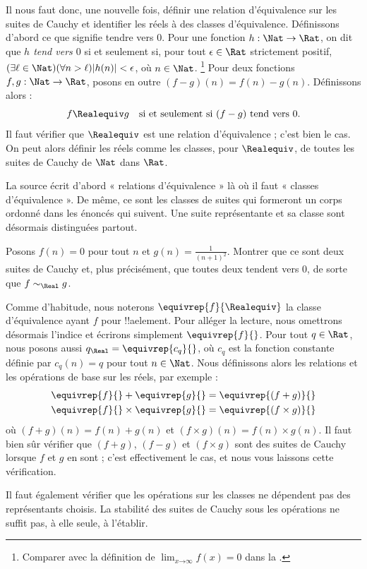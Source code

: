 \documentclass[11pt,a4paper,openany]{memoir}
\begin{document}
Il nous faut donc, une nouvelle fois, définir une relation d'équivalence
sur les suites de Cauchy et identifier les réels à des classes
d'équivalence. Définissons d'abord ce que signifie tendre vers $0$.
Pour une fonction $h:\Nat\to\Rat$, on dit que \emph{$h$ tend vers $0$}
si et seulement si, pour tout $\epsilon\in\Rat$ strictement positif,
$(\exists\ell\in\Nat)(\forall n>\ell)|h(n)|<\epsilon$, où $n\in\Nat$.
\footnote{Comparer avec la définition de
$\lim_{x\mathord{\rightarrow}\infty}f(x)=0$ dans la
.}
Pour deux fonctions $f,g:\Nat\to\Rat$, posons en outre
$(f-g)(n)=f(n)-g(n)$. Définissons alors :
\[
f\Realequiv g\quad\text{si et seulement si }(f-g)\text{ tend vers }0.
\]
Il faut vérifier que $\Realequiv$ est une relation d'équivalence ;
c'est bien le cas. On peut alors définir les réels comme les classes,
pour $\Realequiv$, de toutes les suites de Cauchy de $\Nat$ dans $\Rat$.
\begin{editorial}
La source écrit d'abord « relations d'équivalence » là où il faut
« classes d'équivalence ». De même, ce sont les classes de suites qui
formeront un corps ordonné dans les énoncés qui suivent. Une suite
représentante et sa classe sont désormais distinguées partout.
\end{editorial}

\begin{prob}
Posons $f(n)=0$ pour tout $n$ et $g(n)=\frac{1}{(n+1)^2}$.
Montrer que ce sont deux suites de Cauchy et, plus précisément, que
toutes deux tendent vers $0$, de sorte que $f\sim_\Real g$.
\end{prob}

Comme d'habitude, nous noterons $\equivrep{f}{\Realequiv}$ la classe
d'équivalence ayant $f$ pour !!a{element}. Pour alléger la lecture,
nous omettrons désormais l'indice et écrirons simplement
$\equivrep{f}{}$. Pour tout $q\in\Rat$, nous posons aussi
$q_\Real=\equivrep{c_q}{}$, où $c_q$ est la fonction constante définie
par $c_q(n)=q$ pour tout $n\in\Nat$. Nous définissons alors les
relations et les opérations de base sur les réels, par exemple :
\begin{align*}
\equivrep{f}{}+\equivrep{g}{}&=\equivrep{(f+g)}{}\\
\equivrep{f}{}\times\equivrep{g}{}&=\equivrep{(f\times g)}{}
\end{align*}
où $(f+g)(n)=f(n)+g(n)$ et $(f\times g)(n)=f(n)\times g(n)$.
Il faut bien sûr vérifier que $(f+g)$, $(f-g)$ et $(f\times g)$ sont
des suites de Cauchy lorsque $f$ et $g$ en sont ; c'est effectivement
le cas, et nous vous laissons cette vérification.
\begin{editorial}
Il faut également vérifier que les opérations sur les classes ne
dépendent pas des représentants choisis. La stabilité des suites de
Cauchy sous les opérations ne suffit pas, à elle seule, à l'établir.
\end{editorial}
\end{document}
